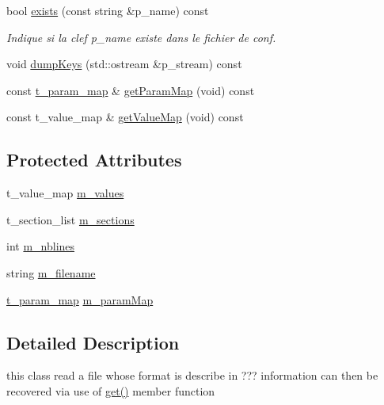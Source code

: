 \begin{DoxyCompactItemize}
bool \hyperlink{classxtd_1_1ConfParser_a7f1323a9ef1f85c73a0bff383e24967c}{exists} (const string \&p\-\_\-name) const 
\begin{DoxyCompactList}\small\item\em Indique si la clef p\-\_\-name existe dans le fichier de conf. \end{DoxyCompactList}\item 
void \hyperlink{classxtd_1_1ConfParser_ae7e7ade9440517b79cc22f21b10df7a5}{dump\-Keys} (std\-::ostream \&p\-\_\-stream) const 
\item 
const \hyperlink{classxtd_1_1ConfParser_a715a3e39fd796046c94546e60f22414d}{t\-\_\-param\-\_\-map} \& \hyperlink{classxtd_1_1ConfParser_a1be1c2813abf959d85bb6cf695c74dec}{get\-Param\-Map} (void) const 
\item 
const t\-\_\-value\-\_\-map \& \hyperlink{classxtd_1_1ConfParser_a34d7366228341b5501bfec94607dd396}{get\-Value\-Map} (void) const 
\end{DoxyCompactItemize}
\subsection*{Protected Attributes}
\begin{DoxyCompactItemize}
\item 
t\-\_\-value\-\_\-map \hyperlink{classxtd_1_1ConfParser_a4c58cc4fa96ebaddd180a0c67edb481f}{m\-\_\-values}
\item 
t\-\_\-section\-\_\-list \hyperlink{classxtd_1_1ConfParser_a100cffb5f33795e50c87ab5fb2a43963}{m\-\_\-sections}
\item 
int \hyperlink{classxtd_1_1ConfParser_a5203f3b8cb6e9070b33371c9acabbc8c}{m\-\_\-nblines}
\item 
string \hyperlink{classxtd_1_1ConfParser_abc9e0b073f91de77b76db39bfbc27508}{m\-\_\-filename}
\item 
\hyperlink{classxtd_1_1ConfParser_a715a3e39fd796046c94546e60f22414d}{t\-\_\-param\-\_\-map} \hyperlink{classxtd_1_1ConfParser_abe309999c7964603bde870c7bda16d2e}{m\-\_\-param\-Map}
\end{DoxyCompactItemize}


\subsection{Detailed Description}
this class read a file whose format is describe in ??? information can then be recovered via use of \hyperlink{classxtd_1_1ConfParser_a5ef18d8778c844ce60f2c93579be7926}{get()} member function 

